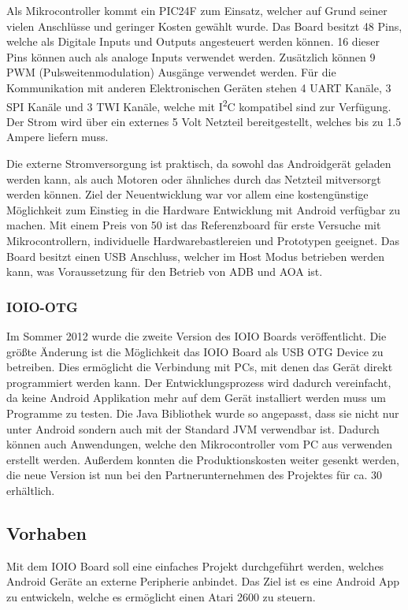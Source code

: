 \documentclass[12pt,journal,compsoc]{IEEEtran}
\begin{document}
Als Mikrocontroller kommt ein PIC24F zum Einsatz, welcher auf Grund seiner vielen Anschlüsse und geringer Kosten gewählt wurde.
Das Board besitzt 48 Pins, welche als Digitale Inputs und Outputs angesteuert werden können. 16 dieser Pins können auch als analoge Inputs verwendet werden.
Zusätzlich können 9 PWM (Pulsweitenmodulation) Ausgänge verwendet werden.
Für die Kommunikation mit anderen Elektronischen Geräten stehen 4 UART Kanäle, 3 SPI Kanäle und 3 TWI Kanäle, welche mit I\textsuperscript{2}C kompatibel sind zur Verfügung.
Der Strom wird über ein externes 5 Volt Netzteil bereitgestellt, welches bis zu 1.5 Ampere liefern muss.

Die externe Stromversorgung ist praktisch, da sowohl das Androidgerät geladen werden kann, als auch Motoren oder ähnliches durch das Netzteil mitversorgt werden können.
Ziel der Neuentwicklung war vor allem eine kostengünstige Möglichkeit zum Einstieg in die Hardware Entwicklung mit Android verfügbar zu machen.
Mit einem Preis von 50\textdollar{} ist das Referenzboard für erste Versuche mit Mikrocontrollern, individuelle Hardwarebastlereien und Prototypen geeignet.
Das Board besitzt einen USB Anschluss, welcher im Host Modus betrieben werden kann, was Voraussetzung für den Betrieb von ADB und AOA ist.

\subsubsection{IOIO-OTG}
Im Sommer 2012 wurde die zweite Version des IOIO Boards veröffentlicht.
Die größte Änderung ist die Möglichkeit das IOIO Board als USB OTG Device zu betreiben.
Dies ermöglicht die Verbindung mit PCs, mit denen das Gerät direkt programmiert werden kann.
Der Entwicklungsprozess wird dadurch vereinfacht, da keine Android Applikation mehr auf dem Gerät installiert werden muss um Programme zu testen.
Die Java Bibliothek wurde so angepasst, dass sie nicht nur unter Android sondern auch mit der Standard JVM verwendbar ist. 
Dadurch können auch Anwendungen, welche den Mikrocontroller vom PC aus verwenden erstellt werden.
Außerdem konnten die Produktionskosten weiter gesenkt werden, die neue Version ist nun bei den Partnerunternehmen des Projektes für ca. 30\textdollar{} erhältlich.

\subsection{Vorhaben}
Mit dem IOIO Board soll eine einfaches Projekt durchgeführt werden, welches Android Geräte an externe Peripherie anbindet.
Das Ziel ist es eine Android App zu entwickeln, welche es ermöglicht einen Atari 2600 zu steuern.
\end{document}

